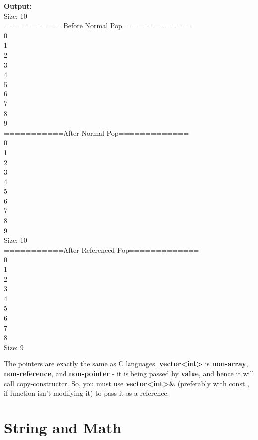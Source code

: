 \documentclass[12pt , a4paper]{article}
\newcommand{\hl}[1]{\colorbox{coolblack}{\color{cream}\textbf{#1}\color{black}}}
\begin{document}
	\begin{tcolorbox}
	\textbf{Output:}\\
	Size: 10\\
	===========Before Normal Pop=============\\
	0\\
	1\\
	2\\
	3\\
	4\\
	5\\
	6\\
	7\\
	8\\
	9\\
	===========After Normal Pop=============\\
	0\\
	1\\
	2\\
	3\\
	4\\
	5\\
	6\\
	7\\
	8\\
	9\\
	Size: 10\\
	===========After Referenced Pop=============\\
	0\\
	1\\
	2\\
	3\\
	4\\
	5\\
	6\\
	7\\
	8\\
	Size: 9
	\end{tcolorbox}
The pointers are exactly the same as C languages. 
\textbf{vector<int>} is \textbf{non-array}, \textbf{non-reference}, and \textbf{non-pointer} - it is being passed by \hl{value}, and hence it will call copy-constructor. So, you must use \hl{vector<int>\&} (preferably with const , if function isn't modifying it) to pass it as a reference.	
\newpage
%
%
\section{String and Math}
\end{document}
